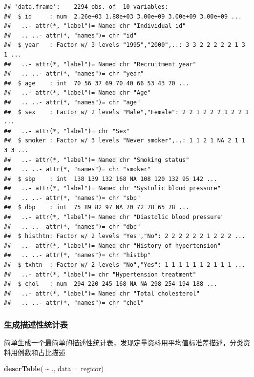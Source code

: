 \documentclass[
]{article}
\newenvironment{Shaded}{\begin{snugshade}}{\end{snugshade}}
\newcommand{\AttributeTok}[1]{\textcolor[rgb]{0.13,0.29,0.53}{#1}}
\newcommand{\FunctionTok}[1]{\textcolor[rgb]{0.13,0.29,0.53}{\textbf{#1}}}
\newcommand{\NormalTok}[1]{#1}
\newcommand{\SpecialCharTok}[1]{\textcolor[rgb]{0.81,0.36,0.00}{\textbf{#1}}}
\begin{document}
\begin{verbatim}
## 'data.frame':    2294 obs. of  10 variables:
##  $ id     : num  2.26e+03 1.88e+03 3.00e+09 3.00e+09 3.00e+09 ...
##   ..- attr(*, "label")= Named chr "Individual id"
##   .. ..- attr(*, "names")= chr "id"
##  $ year   : Factor w/ 3 levels "1995","2000",..: 3 3 2 2 2 2 2 1 3 1 ...
##   ..- attr(*, "label")= Named chr "Recruitment year"
##   .. ..- attr(*, "names")= chr "year"
##  $ age    : int  70 56 37 69 70 40 66 53 43 70 ...
##   ..- attr(*, "label")= Named chr "Age"
##   .. ..- attr(*, "names")= chr "age"
##  $ sex    : Factor w/ 2 levels "Male","Female": 2 2 1 2 2 2 1 2 2 1 ...
##   ..- attr(*, "label")= chr "Sex"
##  $ smoker : Factor w/ 3 levels "Never smoker",..: 1 1 2 1 NA 2 1 1 3 3 ...
##   ..- attr(*, "label")= Named chr "Smoking status"
##   .. ..- attr(*, "names")= chr "smoker"
##  $ sbp    : int  138 139 132 168 NA 108 120 132 95 142 ...
##   ..- attr(*, "label")= Named chr "Systolic blood pressure"
##   .. ..- attr(*, "names")= chr "sbp"
##  $ dbp    : int  75 89 82 97 NA 70 72 78 65 78 ...
##   ..- attr(*, "label")= Named chr "Diastolic blood pressure"
##   .. ..- attr(*, "names")= chr "dbp"
##  $ histhtn: Factor w/ 2 levels "Yes","No": 2 2 2 2 2 2 1 2 2 2 ...
##   ..- attr(*, "label")= Named chr "History of hypertension"
##   .. ..- attr(*, "names")= chr "histbp"
##  $ txhtn  : Factor w/ 2 levels "No","Yes": 1 1 1 1 1 1 2 1 1 1 ...
##   ..- attr(*, "label")= chr "Hypertension treatment"
##  $ chol   : num  294 220 245 168 NA NA 298 254 194 188 ...
##   ..- attr(*, "label")= Named chr "Total cholesterol"
##   .. ..- attr(*, "names")= chr "chol"
\end{verbatim}

\subsubsection{\texorpdfstring{\textbf{生成描述性统计表}}{生成描述性统计表}}\label{ux751fux6210ux63cfux8ff0ux6027ux7edfux8ba1ux8868}

简单生成一个最简单的描述性统计表，发现定量资料用平均值标准差描述，分类资料用例数和占比描述

\begin{Shaded}
\begin{Highlighting}[]
\FunctionTok{descrTable}\NormalTok{( }\SpecialCharTok{\textasciitilde{}}\NormalTok{ ., }\AttributeTok{data =}\NormalTok{ regicor)}
\end{Highlighting}
\end{Shaded}
\end{document}
